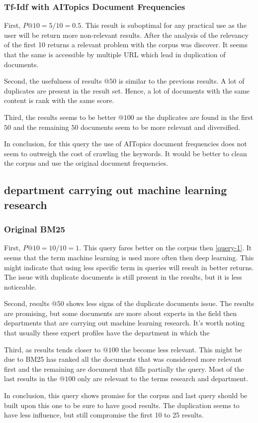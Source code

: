 \subsubsection{Tf-Idf with AITopics Document Frequencies}\label{query-1-tf-idf-aitopics}

\par First, $P@10=5/10=0.5$. This result is suboptimal for any practical use as the user will be return more non-relevant results. After the analysis of the relevancy of the first 10 returns a relevant problem with the corpus was discover. It seems that the same is accessible by multiple URL which lead in duplication of documents.
\par Second, the usefulness of results $@50$ is similar to the previous results. A lot of duplicates are present in the result set. Hence, a lot of documents with the same content is rank with the same score.
\par Third, the results seems to be better $@100$ as the duplicates are found in the first $50$ and the remaining $50$ documents seem to be more relevant and diversified.
\par In conclusion, for this query the use of AITopics document frequencies does not seem to outweigh the cost of crawling the keywords. It would be better to clean the corpus and use the original document frequencies.

\subsection{department carrying out machine learning research}\label{query-2}

\subsubsection{Original BM25}\label{query-2-bm-25}

\par First, $P@10=10/10=1$. This query fares better on the corpus then \ref{query-1}. It seems that the term machine learning is used more often then deep learning. This might indicate that using less specific term in queries will result in better returns. The issue with duplicate documents is still present in the results, but it is less noticeable.
\par Second, results $@50$ shows less signs of the duplicate documents issue. The results are promising, but some documents are more about experts in the field then departments that are carrying out machine learning research. It's worth noting that usually these expert profiles have the department in which the 
\par Third, as results tends closer to $@100$ the become less relevant. This might be due to BM25 has ranked all the documents that was considered more relevant first and the remaining are document that fills partially the query. Most of the last results in the $@100$ only are relevant to the terms research and department.
\par In conclusion, this query shows promise for the corpus and last query should be built upon this one to be sure to have good results. The duplication seems to have less influence, but still compromise the first 10 to 25 results.

